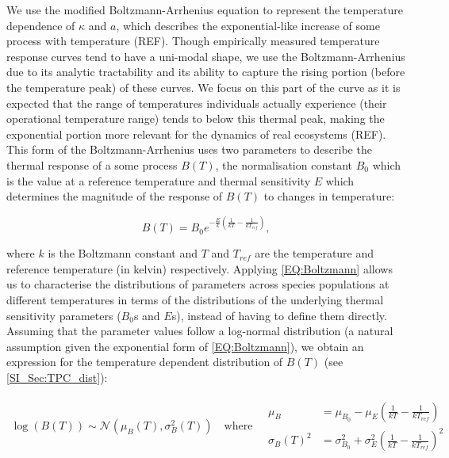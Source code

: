 \documentclass{article}
\begin{document}
We use the modified Boltzmann-Arrhenius equation to represent the temperature dependence of $\kappa$ and $a$, which describes the exponential-like increase of some process with temperature (REF). Though empirically measured temperature response curves tend to have a uni-modal shape, we use the Boltzmann-Arrhenius due to its analytic tractability and its ability to capture the rising portion (before the temperature peak) of these curves. We focus on this part of the curve as it is expected that the range of temperatures individuals actually experience (their operational temperature range) tends to below this thermal peak, making the exponential portion more relevant for the dynamics of real ecosystems (REF). This form of the Boltzmann-Arrhenius uses two parameters to describe the thermal response of a some process $B(T)$, the normalisation constant $B_0$ which is the value at a reference temperature and thermal sensitivity $E$ which determines the magnitude of the response of $B(T)$ to changes in temperature:

\begin{equation} \label{EQ:Boltzmann}
    B(T) = B_0 e^{-\frac{E}{k} \left(\frac{1}{kT} - \frac{1}{k T_{ref} }\right)},
\end{equation}

where $k$ is the Boltzmann constant and $T$ and $T_{ref}$ are the temperature and reference temperature (in kelvin) respectively. Applying \cref{EQ:Boltzmann} allows us to characterise the distributions of parameters across species populations at different temperatures in terms of the distributions of the underlying thermal sensitivity parameters ($B_0$s and $E$s), instead of having to define them directly. Assuming that the parameter values follow a log-normal distribution (a natural assumption given the exponential form of \cref{EQ:Boltzmann}), we obtain an expression for the temperature dependent distribution of $B(T)$ (see \cref{SI_Sec:TPC_dist}):

\begin{align} \label{EQ:Boltz_dist}
    \log(B(T)) \sim \mathcal{N}\left(\mu_{B}(T) , \sigma_{B}^2(T) \right) 
    \quad \text{where} \quad
    \begin{array}{cc}
        \mu_B &= \mu_{B_0} - \mu_{E} \left(\frac{1}{kT} - \frac{1}{k T_{ref} }\right)  \\
        \sigma_{B}(T)^2 &= \sigma_{B_0}^2 + \sigma_{E}^2 \left(\frac{1}{kT} - \frac{1}{k T_{ref} }\right)^2
    \end{array}
\end{align}
\end{document}

